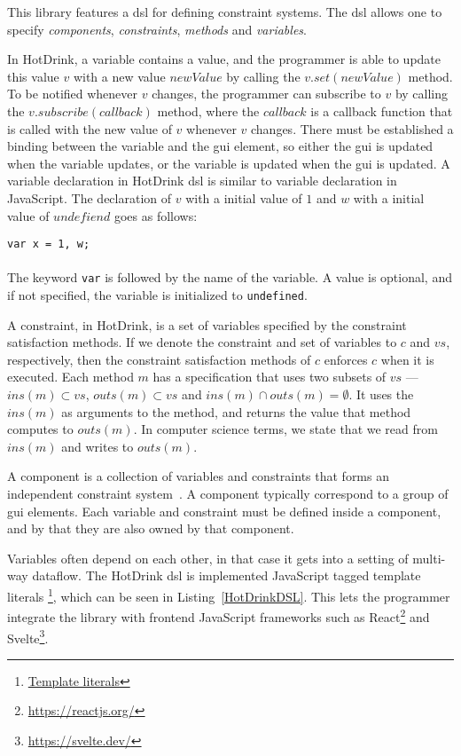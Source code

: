 This library features a \gls{dsl} for defining constraint systems. The \gls{dsl} allows one to specify \emph{components}, \emph{constraints}, \emph{methods} and \emph{variables}. 

In HotDrink, a variable contains a value, and the programmer is able to update this value $v$ with a new value $newValue$ by calling the $v.set(newValue)$ method. To be notified whenever $v$ changes, the programmer can subscribe to $v$ by calling the $v.subscribe(callback)$ method, where the $callback$ is a callback function that is called with the new value of $v$ whenever $v$ changes. There must be established a binding between the variable and the \gls{gui} element, so either the \gls{gui} is updated when the variable updates, or the variable is updated when the \gls{gui} is updated. A variable declaration in HotDrink \gls{dsl} is similar to variable declaration in JavaScript. The declaration of $v$ with a initial value of $1$ and $w$ with a initial value of $undefiend$ goes as follows: 

\texttt{var x = 1, w;}\\\\
The keyword \texttt{var} is followed by the name of the variable. A value is optional, and if not specified, the variable is initialized to \texttt{undefined}. 

A constraint, in HotDrink, is a set of variables specified by the constraint satisfaction methods. If we denote the constraint and set of variables to $c$ and $vs$, respectively, then the constraint satisfaction methods of $c$ enforces $c$ when it is executed. Each method $m$ has a specification that uses two subsets of $vs$ --- $ins(m) \subset vs$, $outs(m) \subset vs$ and $ins(m) \cap outs(m) = \emptyset$. It uses the $ins(m)$ as arguments to the method, and returns the value that method computes to $outs(m)$. In computer science terms, we state that we read from $ins(m)$ and writes to $outs(m)$.

A component is a collection of variables and constraints that forms an independent constraint system~\cite{svartveit2021multithreaded}. A component typically correspond to a group of \gls{gui} elements. Each variable and constraint must be defined inside a component, and by that they are also owned by that component. 

Variables often depend on each other, in that case it gets into a setting of multi-way dataflow. The HotDrink \gls{dsl} is implemented JavaScript tagged template literals \footnote{\href{https://developer.mozilla.org/en-US/docs/Web/JavaScript/Reference/Template_literals}{Template literals}}, which can be seen in Listing~\ref{HotDrinkDSL}. This lets the programmer integrate the library with frontend JavaScript frameworks such as React\footnote{\url{https://reactjs.org/}} and Svelte\footnote{\url{https://svelte.dev/}}. 

